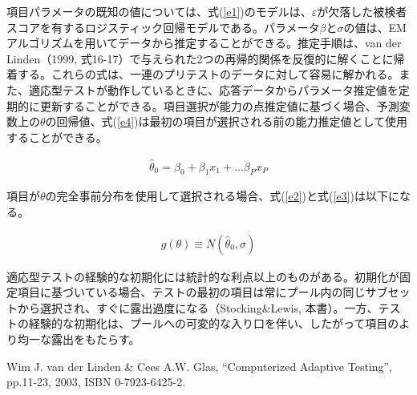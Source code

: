 \documentclass[a4j]{jarticle}
\begin{document}
項目パラメータの既知の値については、式(\ref{e1})のモデルは、$\varepsilon$が欠落した被検者スコアを有するロジスティック回帰モデルである。パラメータ$\beta$と$\sigma$の値は、EMアルゴリズムを用いてデータから推定することができる。推定手順は、van der Linden（1999, 式16-17）で与えられた2つの再帰的関係を反復的に解くことに帰着する。これらの式は、一連のプリテストのデータに対して容易に解かれる。また、適応型テストが動作しているときに、応答データからパラメータ推定値を定期的に更新することができる。項目選択が能力の点推定値に基づく場合、予測変数上の$\theta$の回帰値、式(\ref{e4})は最初の項目が選択される前の能力推定値として使用することができる。

\begin{eqnarray}
  \label{e4}
  \hat{\theta}_{0}=\beta_{0}+\beta_{1}x_{1}+\ldots\beta_{P}x_{P}
\end{eqnarray}

項目が$\theta$の完全事前分布を使用して選択される場合、式(\ref{e2})と式(\ref{e3})は以下になる。

\begin{eqnarray}
  \label{e5}
  g(\theta)\equiv N(\hat{\theta}_{0},\sigma)
\end{eqnarray}

適応型テストの経験的な初期化には統計的な利点以上のものがある。初期化が固定項目に基づいている場合、テストの最初の項目は常にプール内の同じサブセットから選択され、すぐに露出過度になる（Stocking\&Lewis, 本書）。一方、テストの経験的な初期化は、プールへの可変的な入り口を伴い、したがって項目のより均一な露出をもたらす。

\begin{thebibliography}{9}
   Wim J. van der Linden \& Cees A.W. Glas, ``Computerized Adaptive Testing'', pp.11-23, 2003, ISBN 0-7923-6425-2.
\end{thebibliography}
\end{document}
